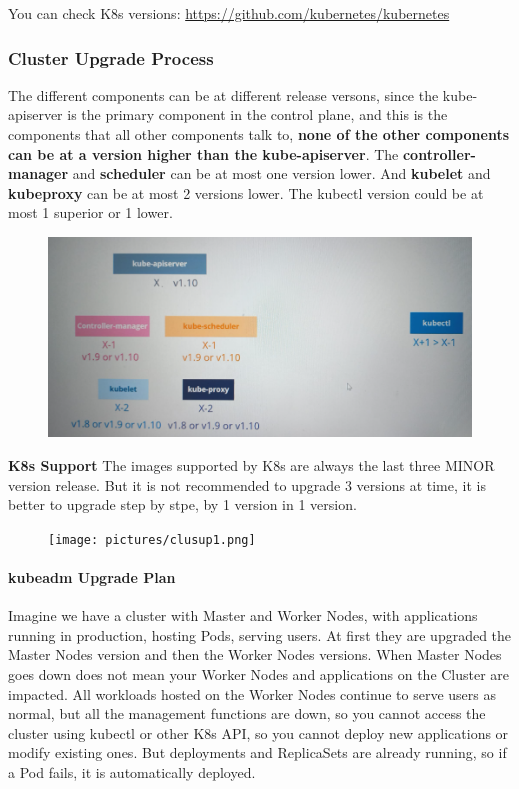 \documentclass{article}
\begin{document}
You can check K8s versions: \href{https://github.com/kubernetes/kubernetes}{https://github.com/kubernetes/kubernetes}

\subsubsection{Cluster Upgrade Process}

The different components can be at different release versons, 
since the kube-apiserver is the primary component in the control plane, 
and this is the components that all other components talk to, \textbf{none of the other components can be at a version higher than the kube-apiserver}. The \textbf{controller-manager} and \textbf{scheduler} can be at most one version lower. And \textbf{kubelet} and \textbf{kubeproxy} can be at most 2 versions lower. The kubectl version could be at most 1 superior or 1 lower.

\begin{figure}[H]
    \includegraphics[scale=0.5]{pictures/clusup.png}
\end{figure}

\textbf{K8s Support}
The images supported by K8s are always the last three MINOR version release. But it is not recommended to upgrade 3 versions at time, it is better to upgrade step by stpe, by 1 version in 1 version.

\begin{figure}[H]
    \texttt{[image: pictures/clusup1.png]}
\end{figure}

\paragraph{kubeadm Upgrade Plan}

Imagine we have a cluster with Master and Worker Nodes, with applications running in production, hosting Pods, serving users. At first they are upgraded the Master Nodes version and then the Worker Nodes versions. When Master Nodes goes down does not mean your Worker Nodes and applications on the Cluster are impacted. All workloads hosted on the Worker Nodes continue to serve users as normal, but all the management functions are down, so you cannot access the cluster using kubectl or other K8s API, so you cannot deploy new applications or modify existing ones.  But deployments and ReplicaSets are already running, so if a Pod fails, it is automatically deployed.
\end{document}
